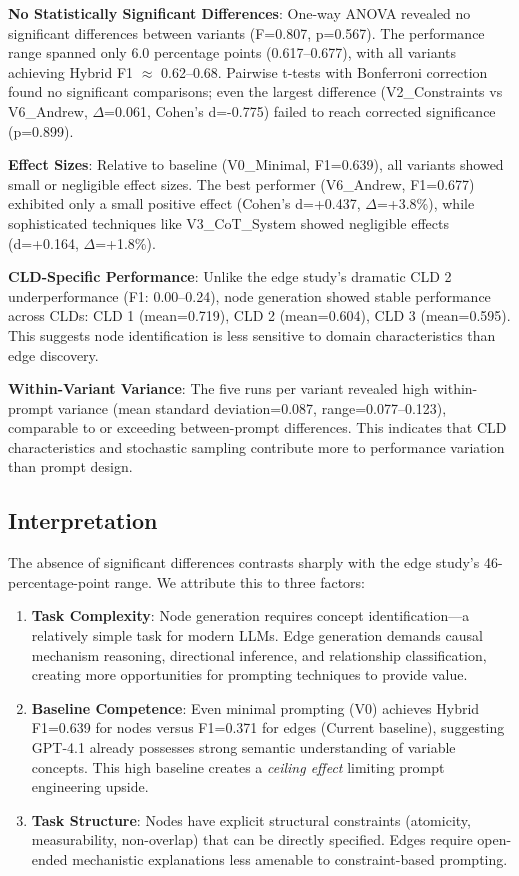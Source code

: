 \textbf{No Statistically Significant Differences}: One-way ANOVA revealed no significant differences between variants (F=0.807, p=0.567). The performance range spanned only 6.0 percentage points (0.617--0.677), with all variants achieving Hybrid F1 $\approx$ 0.62--0.68. Pairwise t-tests with Bonferroni correction found no significant comparisons; even the largest difference (V2\_Constraints vs V6\_Andrew, $\Delta$=0.061, Cohen's d=-0.775) failed to reach corrected significance (p=0.899).

\textbf{Effect Sizes}: Relative to baseline (V0\_Minimal, F1=0.639), all variants showed small or negligible effect sizes. The best performer (V6\_Andrew, F1=0.677) exhibited only a small positive effect (Cohen's d=+0.437, $\Delta$=+3.8\%), while sophisticated techniques like V3\_CoT\_System showed negligible effects (d=+0.164, $\Delta$=+1.8\%).

\textbf{CLD-Specific Performance}: Unlike the edge study's dramatic CLD 2 underperformance (F1: 0.00--0.24), node generation showed stable performance across CLDs: CLD 1 (mean=0.719), CLD 2 (mean=0.604), CLD 3 (mean=0.595). This suggests node identification is less sensitive to domain characteristics than edge discovery.

\textbf{Within-Variant Variance}: The five runs per variant revealed high within-prompt variance (mean standard deviation=0.087, range=0.077--0.123), comparable to or exceeding between-prompt differences. This indicates that CLD characteristics and stochastic sampling contribute more to performance variation than prompt design.

\subsection{Interpretation}

The absence of significant differences contrasts sharply with the edge study's 46-percentage-point range. We attribute this to three factors:

\begin{enumerate}
    \item \textbf{Task Complexity}: Node generation requires concept identification—a relatively simple task for modern LLMs. Edge generation demands causal mechanism reasoning, directional inference, and relationship classification, creating more opportunities for prompting techniques to provide value.
    
    \item \textbf{Baseline Competence}: Even minimal prompting (V0) achieves Hybrid F1=0.639 for nodes versus F1=0.371 for edges (Current baseline), suggesting GPT-4.1 already possesses strong semantic understanding of variable concepts. This high baseline creates a \textit{ceiling effect} limiting prompt engineering upside.
    
    \item \textbf{Task Structure}: Nodes have explicit structural constraints (atomicity, measurability, non-overlap) that can be directly specified. Edges require open-ended mechanistic explanations less amenable to constraint-based prompting.
\end{enumerate}

